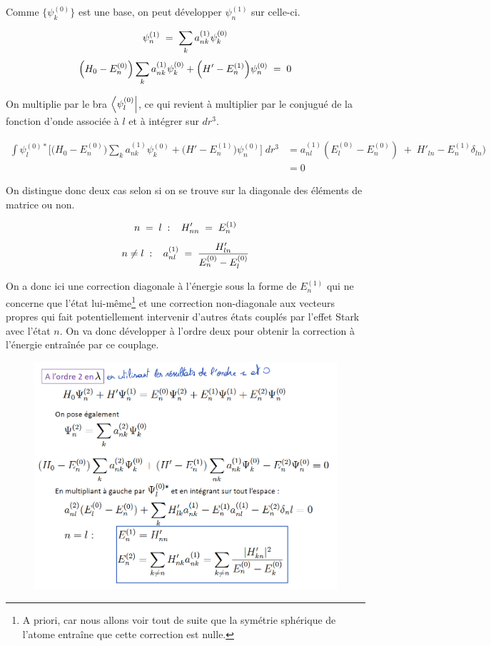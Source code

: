 Comme $\{\psi_k^{(0)}\}$ est une base, on peut développer $\psi_n^{(1)}$ sur celle-ci.

\[
    \psi_n^{(1)} \; = \; \sum_k a_{nk}^{(1)} \psi_k^{(0)}
\]
\[
    \Big(H_0 - E^{(0)}_n\Big)\sum_k a_{nk}^{(1)} \psi_k^{(0)} + \Big(H' - E^{(1)}_n\Big)\psi_n^{(0)} \; = \; 0
\]

On multiplie par le bra $\bra{\psi^{(0)}_l}$, ce qui revient à multiplier par le conjugué de la fonction d'onde associée à $l$ et à intégrer sur $dr^3$.

\begin{align*}
    \int \psi^{(0)*}_l\Big[ \Big(H_0 - E^{(0)}_n\Big)\sum_k a_{nk}^{(1)} \psi_k^{(0)} + \Big(H' - E^{(1)}_n\Big)\psi_n^{(0)}\Big] \;dr^3 &= a^{(1)}_{nl}(E^{(0)}_l-E^{(0)}_n) \;+\; H'_{ln} - E^{(1)}_n\delta_{ln})\\
    &= 0
\end{align*}

On distingue donc deux cas selon si on se trouve sur la diagonale des éléments de matrice ou non.

\[
    n \; = \;  l\;:\;\;\; H'_{nn} \; = \; E^{(1)}_n
\]
\[
    n \neq l\;:\;\;\; a^{(1)}_{nl} \; = \; \dfrac{H'_{ln}}{E^{(0)}_n-E^{(0)}_l}
\]

On a donc ici une correction diagonale à l'énergie sous la forme de $E^{(1)}_n$ qui ne concerne que l'état lui-même\footnote{A priori, car nous allons voir tout de suite que la symétrie sphérique de l'atome entraîne que cette correction est nulle.} et une correction non-diagonale aux vecteurs propres qui fait potentiellement intervenir d'autres états couplés par l'effet Stark avec l'état $n$. On va donc développer à l'ordre deux pour obtenir la correction à l'énergie entraînée par ce couplage.\\

\begin{figure}[tph]
    \centering
    \includegraphics[scale=0.65]{Images2/ordre2.1.PNG}
\end{figure}

